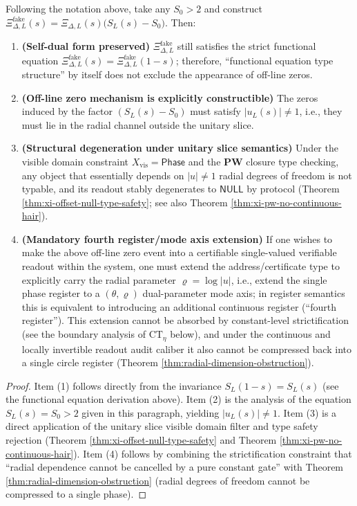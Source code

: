 \begin{proposition}\label{prop:xi-offcritical-constructible-but-null-or-extra-register}
Following the notation above, take any \(S_0>2\) and construct
\(
\Xi^{\mathrm{fake}}_{\Delta,L}(s)=\Xi_{\Delta,L}(s)\bigl(S_L(s)-S_0\bigr)
\).
Then:
\begin{enumerate}
  \item \textbf{(Self-dual form preserved)}
  \(\Xi^{\mathrm{fake}}_{\Delta,L}\) still satisfies the strict functional equation \(\Xi^{\mathrm{fake}}_{\Delta,L}(s)=\Xi^{\mathrm{fake}}_{\Delta,L}(1-s)\); therefore, ``functional equation type structure'' by itself does not exclude the appearance of off-line zeros.
  \item \textbf{(Off-line zero mechanism is explicitly constructible)}
  The zeros induced by the factor \((S_L(s)-S_0)\) must satisfy \(|u_L(s)|\neq 1\), i.e., they must lie in the radial channel outside the unitary slice.
  \item \textbf{(Structural degeneration under unitary slice semantics)}
  Under the visible domain constraint \(X_{\mathrm{vis}}=\mathsf{Phase}\) and the \(\mathbf{PW}\) closure type checking, any object that essentially depends on \(|u|\neq 1\) radial degrees of freedom is not typable, and its readout stably degenerates to \(\mathsf{NULL}\) by protocol (Theorem \ref{thm:xi-offset-null-type-safety}; see also Theorem \ref{thm:xi-pw-no-continuous-hair}).
  \item \textbf{(Mandatory fourth register/mode axis extension)}
  If one wishes to make the above off-line zero event into a certifiable single-valued verifiable readout within the system, one must extend the address/certificate type to explicitly carry the radial parameter \(\varrho=\log|u|\), i.e., extend the single phase register to a \((\theta,\varrho)\) dual-parameter mode axis; in register semantics this is equivalent to introducing an additional continuous register (``fourth register'').
  This extension cannot be absorbed by constant-level strictification (see the boundary analysis of \(\mathrm{CT}_\eta\) below), and under the continuous and locally invertible readout audit caliber it also cannot be compressed back into a single circle register (Theorem \ref{thm:radial-dimension-obstruction}).
\end{enumerate}
\end{proposition}

\begin{proof}
Item (1) follows directly from the invariance \(S_L(1-s)=S_L(s)\) (see the functional equation derivation above).
Item (2) is the analysis of the equation \(S_L(s)=S_0>2\) given in this paragraph, yielding \(|u_L(s)|\neq 1\).
Item (3) is a direct application of the unitary slice visible domain filter and type safety rejection (Theorem \ref{thm:xi-offset-null-type-safety} and Theorem \ref{thm:xi-pw-no-continuous-hair}).
Item (4) follows by combining the strictification constraint that ``radial dependence cannot be cancelled by a pure constant gate'' with Theorem \ref{thm:radial-dimension-obstruction} (radial degrees of freedom cannot be compressed to a single phase). \qedhere
\end{proof}

